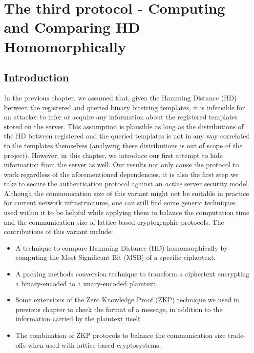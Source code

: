 \chapter{The third protocol - Computing and Comparing HD Homomorphically}
\label{chap:thirdProtocol}

\ifpdf
\graphicspath{{Chapter5/Figs/Raster/}{Chapter5/Figs/PDF/}{Chapter5/Figs/}}
\else
\graphicspath{{Chapter5/Figs/Vector/}{Chapter5/Figs/}}
\fi


\section{Introduction}
\label{sub:introChap3}
In the previous chapter, we assumed that, given the Hamming Distance (HD) between the registered and queried
binary bitstring templates, it is infeasible for an attacker to infer or acquire any information
about the registered templates stored on the server. This assumption is plausible as long as the
distributions of the HD between registered and the queried templates is not in any way
correlated to the templates themselves (analysing these distributions is out of scope of the
project). However, in this chapter, we introduce our first attempt to hide 
information from the server as well. Our results not only cause the protocol
to work regardless of the aforementioned dependencies, it is also the first step we take to
secure the authentication protocol against an \textit{active} server security model. Although the communication size of this variant might not
be suitable in practice for current network infrastructures, one can
still find some generic techniques used within it to be helpful while
applying them to balance the computation time and the communication size of
lattice-based cryptographic protocols. The contributions of this variant include:
\begin{itemize}
\item A technique to compare Hamming Distance (HD) homomorphically by computing
  the Most Significant Bit (MSB) of a specific ciphertext.
\item A packing methods conversion technique to transform a ciphertext
  encrypting a binary-encoded to a unary-encoded plaintext.
\item Some extensions of the Zero Knowledge Proof (ZKP) technique we used
  in previous chapter to check the format of a message, in addition to the
  information carried by the plaintext itself.
\item The combination of ZKP protocols to balance the communication size
  trade-offs when used with lattice-based cryptosystems.
\end{itemize}


